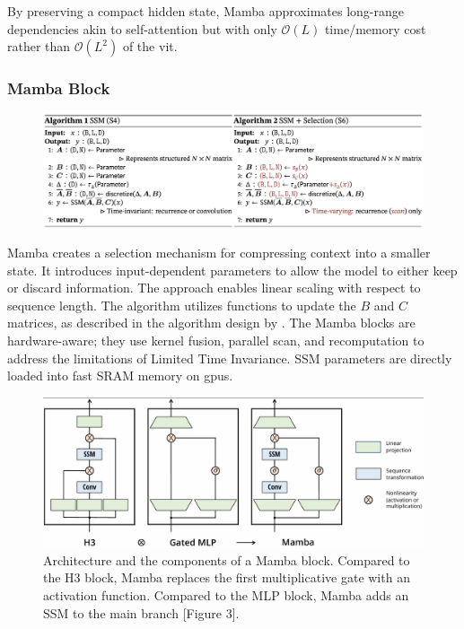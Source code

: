 By preserving a compact hidden state, Mamba approximates long-range dependencies akin to self-attention but with only \(\mathcal{O}(L)\) time/memory cost rather than \(\mathcal{O}(L^2)\) of the \acrfull{vit}.  


\subsubsection{Mamba Block}

\begin{figure}[h]
    \centering
    \includegraphics[width=1\linewidth]{figures/mamba_algorithm.png}
\end{figure}

Mamba\cite{gu_mamba_2024} creates a selection mechanism for compressing context into a smaller state. It introduces input-dependent parameters to allow the model to either keep or discard information. The approach enables linear scaling with respect to sequence length. The algorithm utilizes functions to update the \(B\) and \(C\) matrices, as described in the algorithm design by \textcite{gu_mamba_2024}. The Mamba blocks are hardware-aware; they use kernel fusion, parallel scan, and recomputation to address the limitations of Limited Time Invariance. SSM parameters are directly loaded into fast SRAM memory on \acrshort{gpu}s. 


\begin{figure}
    \centering
    \includegraphics[width=\linewidth]{figures/h3_mlp_mamba.png}
    \caption{Architecture and the components of a Mamba block.  Compared to the H3 block, Mamba replaces the first multiplicative gate with an activation function. Compared to the MLP block, Mamba adds an SSM to the main branch \cite{gu_mamba_2024}[Figure 3].} 
    \label{fig:h3_mlp_mamba}
\end{figure}



